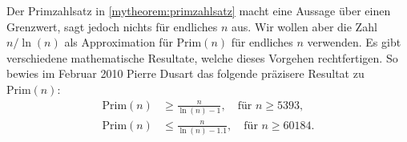 \begin{myexcursion}\label{myexcursion:finiteN}
	Der Primzahlsatz in \cref{mytheorem:primzahlsatz} macht eine Aussage über einen Grenzwert, sagt jedoch nichts für endliches $n$ aus. Wir wollen aber die Zahl $n/\ln(n)$ als Approximation für $\text{Prim}(n)$ für endliches $n$ verwenden. Es gibt verschiedene mathematische Resultate, welche dieses Vorgehen rechtfertigen. So bewies im Februar 2010\cite{EstimatePrimes} Pierre Dusart das folgende präzisere Resultat zu $\text{Prim}(n)$:
	\begin{align}
		\text{Prim}(n) & \geq \frac{n}{\ln(n) - 1}, \quad\text{für } n\geq \num{5393},    \\
		\text{Prim}(n) & \leq \frac{n}{\ln(n) - 1.1}, \quad\text{für } n\geq \num{60184}.
	\end{align}
\end{myexcursion}

%

